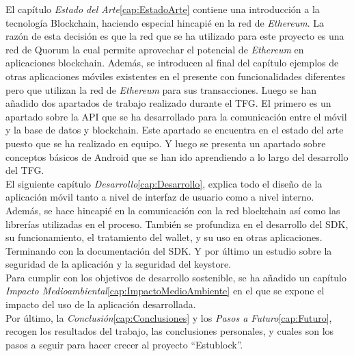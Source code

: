 El capítulo \emph{Estado del Arte}\ref{cap:EstadoArte} contiene una introducción a la tecnología Blockchain, haciendo especial hincapié en la red de \emph{Ethereum}\cite{webEthereum}. La razón de esta decisión es que la red que se ha utilizado para este proyecto es una red de Quorum\cite{webQuorum} la cual permite aprovechar el potencial de \emph{Ethereum} en aplicaciones blockchain. Además, se introducen al final del capítulo ejemplos de otras aplicaciones móviles existentes en el presente con funcionalidades diferentes pero que utilizan la red de \emph{Ethereum} para sus transacciones. Luego se han añadido dos apartados de trabajo realizado durante el TFG. El primero es un apartado sobre la API que se ha desarrollado para la comunicación entre el móvil y la base de datos y blockchain. Este apartado se encuentra en el estado del arte puesto que se ha realizado en equipo. Y luego se presenta un apartado sobre conceptos básicos de Android que se han ido aprendiendo a lo largo del desarrollo del TFG. \\

El siguiente capítulo \emph{Desarrollo}\ref{cap:Desarrollo}, explica todo el diseño de la aplicación móvil tanto a nivel de interfaz de usuario como a nivel interno. Además, se hace hincapié en la comunicación con la red blockchain así como las librerías utilizadas en el proceso. También se profundiza en el desarrollo del SDK, su funcionamiento, el tratamiento del wallet, y su uso en otras aplicaciones. Terminando con la documentación del SDK. Y por último un estudio sobre la seguridad de la aplicación y la seguridad del keystore. \\

Para cumplir con los objetivos de desarrollo sostenible, se ha añadido un capítulo \emph{Impacto Medioambiental}\ref{cap:ImpactoMedioAmbiente} en el que se expone el impacto del uso de la aplicación desarrollada. \\

Por último, la \emph{Conclusión}\ref{cap:Conclusiones} y los \emph{Pasos a Futuro}\ref{cap:Futuro}, recogen los resultados del trabajo, las conclusiones personales, y cuales son los pasos a seguir para hacer crecer al proyecto ``Estublock''.

